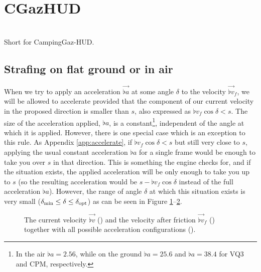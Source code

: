 \section{CGazHUD}
\label{sec:cgazhud}
\cite{injx_physics}\\
Short for CampingGaz-HUD.

\subsection{Strafing on flat ground or in air}
\label{sec:normal_strafe}
When we try to apply an acceleration $\vec{\flat{a}}$ at some angle $\delta$ to the velocity $\vec{\flat{v}}_f$, we will be allowed to accelerate provided that the component of our current velocity in the proposed direction is smaller than $s$, also expressed as $\flat{v}_f \cos\delta < s$. The size of the acceleration applied, $\flat{a}$, is a constant\footnote{In the air $\flat{a} = 2.56$, while on the ground $\flat{a} = 25.6$ and $\flat{a} = 38.4$ for VQ3 and CPM, respectively.}, independent of the angle at which it is applied. However, there is one special case which is an exception to this rule. As Appendix \ref{app:accelerate}, if $\flat{v}_f \cos\delta < s$ but still very close to $s$, applying the usual constant acceleration $\flat{a}$ for a single frame would be enough to take you over $s$ in that direction. This is something the engine checks for, and if the situation exists, the applied acceleration will be only enough to take you up to $s$ (so the resulting acceleration would be $s - \flat{v}_f \cos\delta$ instead of the full acceleration $\flat{a}$). However, the range of angle $\delta$ at which this situation exists is very small ($\delta_{\min} \le \delta \le \delta_{\operatorname{opt}}$) as can be seen in Figure \ref{fig:delta_min_friction}--\ref{fig:delta_opt_friction}.
\begin{figure}[H]
	\centering
	\begin{subfigure}[t]{.33\textwidth}
		\centering
		\setlength\figureheight{5.5cm}
		\setlength\figurewidth{5.5cm}
		\caption{}
		\label{fig:delta_min_friction}
	\end{subfigure}%
	\begin{subfigure}[t]{.33\textwidth}
		\centering
		\setlength\figureheight{5.5cm}
		\setlength\figurewidth{5.5cm}
		\caption{}
		\label{fig:delta_opt_friction}
	\end{subfigure}%
	\begin{subfigure}[t]{.33\textwidth}
		\centering
		\setlength\figureheight{5.5cm}
		\setlength\figurewidth{5.5cm}
		\caption{}
		\label{fig:delta_max_friction}
	\end{subfigure}
	\caption{The current velocity $\vec{\flat{v}}$ (\yellowdenselydottedarrow) and the velocity after friction $\vec{\flat{v}}_f$ (\yellowarrow) together with all possible acceleration configurations (\lightorangearea).}
\end{figure}
